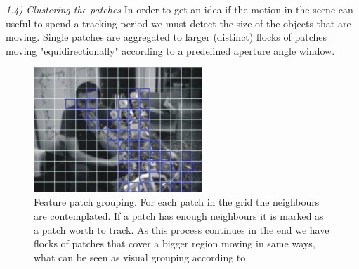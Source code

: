 %
\textit{1.4) Clustering the patches}  \newline%
In order to get an idea if the motion in the scene can useful to spend a tracking period we must detect the size of the objects that are moving. Single patches are aggregated to larger (distinct) flocks of patches moving "equidirectionally" according to a predefined aperture angle window. \newline
\begin{figure}
	\begin{center}
		\includegraphics[width=2.5in]{imgs/method/selection.pdf}
		\caption[Feature patch grouping. ]{Feature patch grouping. For each patch in the grid the neighbours are contemplated. If a patch has enough neighbours it is marked as a patch worth to track. As this process continues in the end we have flocks of patches that cover a bigger region moving in same ways, what can be seen as visual grouping according to \cite{ULGII23} 
		}
		\label{fig:flocking}
	\end{center}
\end{figure}
